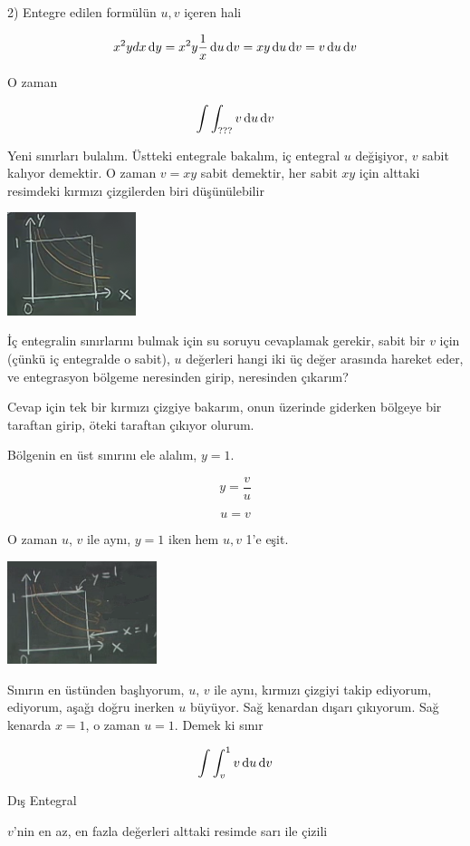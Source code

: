 \documentclass[12pt,fleqn]{article}\usepackage{../../common}
\begin{document}
2) Entegre edilen formülün $u,v$ içeren hali 

$$ x^2y dx \,\mathrm{d} y =  x^2y  \frac{1}{x} \,\mathrm{d} u \,\mathrm{d} v = 
xy \,\mathrm{d} u \,\mathrm{d} v = 
v  \,\mathrm{d} u \,\mathrm{d} v 
$$

O zaman 

$$ \int \int_{???} v \,\mathrm{d} u \,\mathrm{d} v $$

Yeni sınırları bulalım. Üstteki entegrale bakalım, iç entegral $u$
değişiyor, $v$ sabit kalıyor demektir. O zaman $v=xy$ sabit demektir, her
sabit $xy$ için alttaki resimdeki kırmızı çizgilerden biri düşünülebilir

\includegraphics[height=3cm]{18_6.png}

İç entegralin sınırlarını bulmak için su soruyu cevaplamak gerekir, sabit bir
$v$ için (çünkü iç entegralde o sabit), $u$ değerleri hangi iki üç değer
arasında hareket eder, ve entegrasyon bölgeme neresinden girip, neresinden
çıkarım?

Cevap için tek bir kırmızı çizgiye bakarım, onun üzerinde giderken bölgeye
bir taraftan girip, öteki taraftan çıkıyor olurum. 

Bölgenin en üst sınırını ele alalım, $y=1$. 

$$ y = \frac{v}{u}  $$

$$ u = v $$

O zaman $u$, $v$ ile aynı, $y=1$ iken hem $u,v$ 1'e eşit.

\includegraphics[height=3cm]{18_7.png}

Sınırın en üstünden başlıyorum, $u$, $v$ ile aynı, kırmızı çizgiyi takip
ediyorum, ediyorum, aşağı doğru inerken $u$ büyüyor. Sağ kenardan dışarı
çıkıyorum. Sağ kenarda $x=1$, o zaman $u = 1$. Demek ki sınır

$$ \int \int _v^1 v \,\mathrm{d} u \,\mathrm{d} v $$

Dış Entegral 

$v$'nin en az, en fazla değerleri alttaki resimde sarı ile çizili
\end{document}
